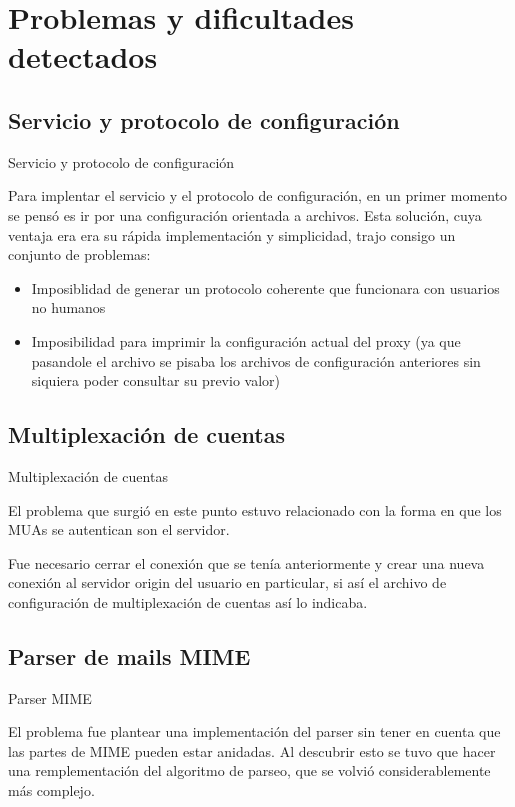 \documentclass{beamer}
\begin{document}
\section{Problemas y dificultades detectados}
\subsection{Servicio y protocolo de configuración}
\begin{frame}{Servicio y protocolo de configuración}
\par Para implentar el servicio y el protocolo de configuración, en un primer momento se pensó es ir por una configuración orientada a archivos. Esta solución, cuya ventaja era era su rápida implementación y simplicidad, trajo consigo un conjunto de problemas:\\
\begin{itemize}
\item Imposiblidad de generar un protocolo coherente que funcionara con usuarios no humanos
\item Imposibilidad para imprimir la configuración actual del proxy (ya que pasandole el archivo se pisaba los archivos de configuración anteriores sin siquiera poder consultar su previo valor)
\end{itemize}
\end{frame}

\subsection{Multiplexación de cuentas}
\begin{frame}{Multiplexación de cuentas}
\par El problema que surgió en este punto estuvo relacionado con la forma en que los MUAs se autentican son el servidor. \\[0.5cm]
\par Fue necesario cerrar el conexión que se tenía anteriormente y crear una nueva conexión al servidor origin del usuario en particular, si así el archivo de configuración de multiplexación de cuentas así lo indicaba.
\end{frame}

\subsection{Parser de mails MIME}
\begin{frame}{Parser MIME}
\par El problema fue plantear una implementación del parser sin tener en cuenta que las partes de MIME pueden estar anidadas. Al descubrir esto se tuvo que hacer una remplementación del algoritmo de parseo, que se volvió considerablemente más complejo.
\end{frame}
\end{document}
